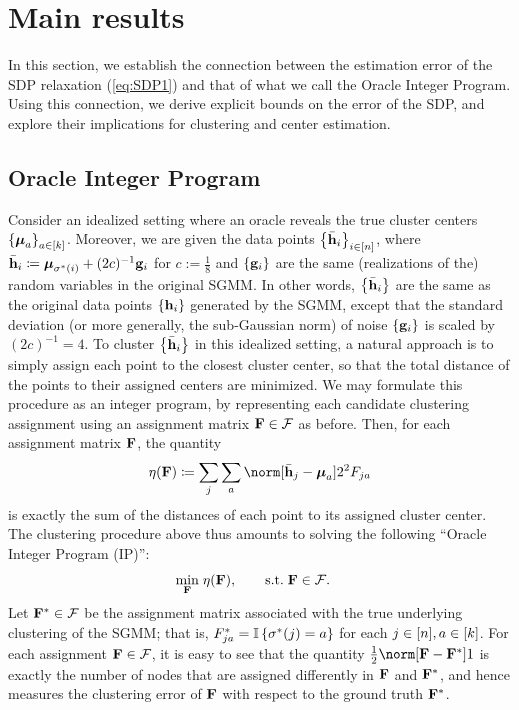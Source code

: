 
\section{Main results \label{sec:main}}

In this section, we establish the connection between the estimation
error of the SDP relaxation (\ref{eq:SDP1}) and that of what we call
the Oracle Integer Program. Using this connection, we derive explicit
bounds on the error of the SDP, and explore their implications for
clustering and center estimation.

\subsection{Oracle Integer Program}

Consider an idealized setting where an oracle reveals the true cluster
centers $\left\{ \boldsymbol{\mu}_{a}\right\} _{a\in\left[k\right]}$.
Moreover, we are given the data points $\left\{ \bar{\mathbf{h}}_{i}\right\} _{i\in[n]}$,
where $\bar{\mathbf{h}}_{i}\coloneqq\boldsymbol{\mu}_{\sigma^{*}(i)}+(2c)^{-1}\mathbf{g}_{i}$
for $c:=\frac{1}{8}$ and $\left\{ \mathbf{g}_{i}\right\} $ are the same
(realizations of the) random variables in the original SGMM. In other
words, $\left\{ \bar{\mathbf{h}}_{i}\right\} $ are the same as the original
data points $\left\{ \mathbf{h}_{i}\right\} $ generated by the SGMM, except
that the standard deviation (or more generally, the sub-Gaussian norm)
of noise $\left\{ \mathbf{g}_{i}\right\} $ is scaled by $(2c)^{-1}=4$. To
cluster $\left\{ \bar{\mathbf{h}}_{i}\right\} $ in this idealized setting,
a natural approach is to simply assign each point to the closest cluster
center, so that the total distance of the points to their assigned
centers are minimized. We may formulate this procedure as an integer
program, by representing each candidate clustering assignment using
an assignment matrix $\mathbf{F}\in\mathcal{F}$ as before. Then, for each
assignment matrix $\mathbf{F}$, the quantity 
\[
\eta(\F)\coloneqq\sum_{j}\sum_{a}\norm[\bar{\h}_{j}-\Mean_{a}]2^{2}F_{ja}
\]
is exactly the sum of the distances of each point to its assigned
cluster center. The clustering procedure above thus amounts to solving
the following ``Oracle Integer Program (IP)'':
\begin{equation}
\begin{aligned}\min_{\mathbf{F}}\; & \eta(\mathbf{F}),\qquad\text{s.t.}\;\mathbf{F}\in\mathcal{F}.\end{aligned}
\label{eq:oracleIP}
\end{equation}
Let $\mathbf{F}^{*}\in\mathcal{F}$ be the assignment matrix associated with
the true underlying clustering of the SGMM; that is, $F_{ja}^{*}=\operatorname*{\mathbb{I}}\left\{ \sigma^{*}(j)=a\right\} $
for each $j\in[n],a\in[k]$. For each assignment $\mathbf{F}\in\mathcal{F}$,
it is easy to see that the quantity $\frac{1}{2}\norm[\F-\F^{*}]1$
is exactly the number of nodes that are assigned differently in $\mathbf{F}$
and $\mathbf{F}^{*}$, and hence measures the clustering error of $\mathbf{F}$ with
respect to the ground truth $\mathbf{F}^{*}$.


